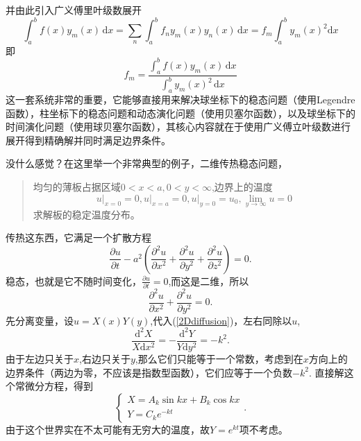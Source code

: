 \documentclass[12pt,a4paper,openany,twoside]{book}
\numberwithin{equation}{section}
\newcommand{\ud}{\mathrm{d}}
\begin{document}
          并由此引入广义傅里叶级数展开
          \begin{equation*}
            \int ^b_a f(x) y_m(x) \, \ud x = \sum_n \int^b_a f_n y_m(x)y_n(x) \, \ud x = f_m \int^b_a y_m(x)^2 \ud x 
          \end{equation*} 
          即
          \begin{equation*}
            f_m = \frac{\int ^b_a f(x) y_m(x) \, \ud x }{\int^b_a y_m(x)^2 \, \ud x }
          \end{equation*} 
          这一套系统非常的重要，它能够直接用来解决球坐标下的稳态问题（使用Legendre函数），柱坐标下的稳态问题和动态演化问题（使用贝塞尔函数），以及球坐标下的时间演化问题（使用球贝塞尔函数），其核心内容就在于使用广义傅立叶级数进行展开得到精确解并同时满足边界条件。

          没什么感觉？在这里举一个非常典型的例子，二维传热稳态问题，
          \begin{quote}
            均匀的薄板占据区域$0<x<a,0<y<\infty$,边界上的温度
            \begin{equation*}
              u\big|_{x=0} = 0, u\big|_{x=a} = 0, u\big|_{y=0} = u_0, \lim_{y \to \infty} u =0
            \end{equation*} 
            求解板的稳定温度分布。
          \end{quote}
          传热这东西，它满足一个扩散方程
          \begin{equation}
            \frac{\partial u}{\partial t} -a^2 (\frac{\partial ^2 u}{\partial x^2 } + \frac{\partial^2 u}{\partial y^2} + \frac{\partial ^2 u}{\partial z^2}  ) = 0.
          \end{equation}
          稳态，也就是它不随时间变化，$\frac{\partial u}{\partial t} = 0$,而这是二维，所以
          \begin{equation}
            \frac{\partial ^2 u}{\partial x^2 } + \frac{\partial ^2 u}{\partial y^2 } = 0.
            \label{2Ddiffusion}
          \end{equation}
          先分离变量，设$u=X(x)Y(y)$,代入(\ref{2Ddiffusion})，左右同除以$u$,
          \begin{equation}
            \frac{\ud ^2 X}{X \ud x^2} = - \frac{\ud ^2 Y}{Y \ud y^2} = -k^2 .
          \end{equation}
          由于左边只关于$x$,右边只关于$y$,那么它们只能等于一个常数，考虑到在$x$方向上的边界条件（两边为零，不应该是指数型函数），它们应等于一个负数$-k^2$.
          直接解这个常微分方程，得到
          \begin{equation}
            \begin{cases}
              X = A_k\sin{kx} + B_k\cos{kx} \\
              Y = C_k e^{-kt}
            \end{cases}.
          \end{equation}
          由于这个世界实在不太可能有无穷大的温度，故$Y = e^{kt}$项不考虑。
\end{document}

